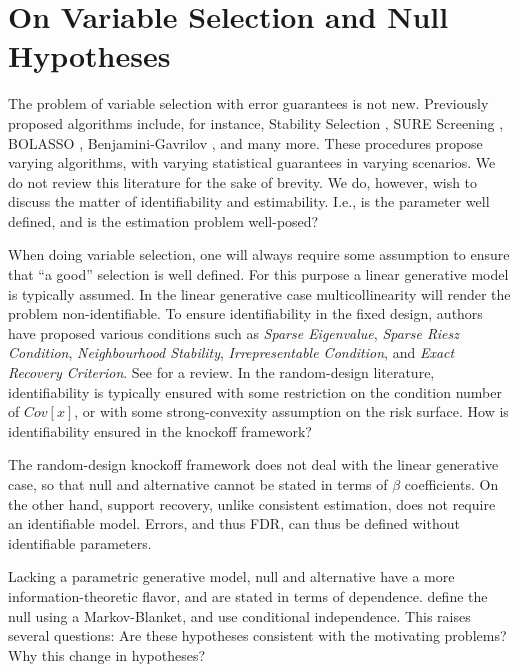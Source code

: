 \documentclass[article,lineno]{biometrika}
\begin{document}
\section{On Variable Selection and Null Hypotheses}
The problem of variable selection with error guarantees is not new. 
Previously proposed algorithms include, for instance, Stability Selection \citep{MeinshausenStabilityselection2010}, SURE Screening \citep{fan2008sure}, BOLASSO \citep{bach2008bolasso}, Benjamini-Gavrilov \citep{Benjaminisimpleforwardselection2009}, and many more. 
These procedures propose varying algorithms, with varying statistical guarantees in varying scenarios. 
We do not review this literature for the sake of brevity. 
We do, however, wish to discuss the matter of identifiability and estimability. 
I.e., is the parameter well defined, and is the estimation problem well-posed? 

When doing variable selection, one will always require some assumption to ensure that ``a good'' selection is well defined. 
For this purpose a linear generative model is typically assumed. 
In the linear generative case multicollinearity will render the problem non-identifiable. 
To ensure identifiability in the fixed design, authors have proposed various conditions such as \emph{Sparse Eigenvalue}, \emph{Sparse Riesz Condition}, \emph{Neighbourhood Stability}, \emph{Irrepresentable Condition}, and \emph{Exact Recovery Criterion}. 
See \citet[Sec 3.1.1]{MeinshausenStabilityselection2010} for a review. 
In the random-design literature, identifiability is typically ensured with some restriction on the condition number of $Cov[x]$, or with some strong-convexity assumption on the risk surface. 
How is identifiability ensured in the knockoff framework? 

The random-design knockoff framework does not deal with the linear generative case, so that null and alternative cannot be stated in terms of $\beta$ coefficients. 
On the other hand, support recovery, unlike consistent estimation, does not require an identifiable model. 
Errors, and thus FDR, can thus be defined without identifiable parameters. 

Lacking a parametric generative model, null and alternative have a more information-theoretic flavor, and are stated in terms of dependence. 
\citet{CandesPanninggoldmodelX2018} define the null using a Markov-Blanket, and \cite{SesiaGenehuntinghidden} use conditional independence. 
This raises several questions:
Are these hypotheses consistent with the motivating problems?
Why this change in hypotheses?
\end{document}
